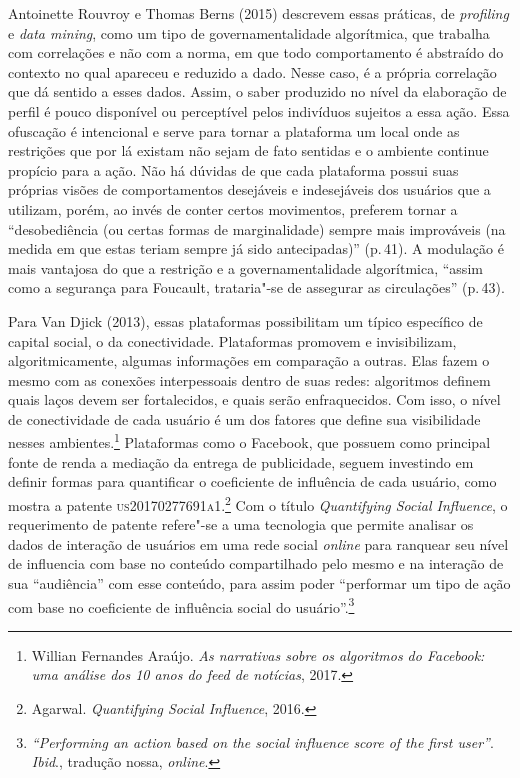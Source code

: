 Antoinette Rouvroy e Thomas Berns (2015) descrevem essas práticas, 
de \textit{profiling} e \textit{data mining}, como um tipo de
governamentalidade algorítmica, que trabalha com correlações e não com a
norma, em que todo comportamento é abstraído do contexto no qual
apareceu e reduzido a dado. Nesse caso, é a própria correlação que dá
sentido a esses dados. Assim, o saber produzido no nível da elaboração
de perfil é pouco disponível ou perceptível pelos indivíduos sujeitos a
essa ação. Essa ofuscação é intencional e serve para tornar a plataforma
um local onde as restrições que por lá existam não sejam de fato
sentidas e o ambiente continue propício para a ação. Não há dúvidas de
que cada plataforma possui suas próprias visões de comportamentos
desejáveis e indesejáveis dos usuários que a utilizam, porém, ao invés
de conter certos movimentos, preferem tornar a ``desobediência (ou
certas formas de marginalidade) sempre mais improváveis (na medida em
que estas teriam sempre já sido antecipadas)'' (p.\,41). A modulação é mais
vantajosa do que a restrição e a governamentalidade algorítmica, ``assim
como a segurança para Foucault, trataria"-se de assegurar as
circulações'' (p.\,43).

Para Van Djick (2013), essas plataformas possibilitam um típico
específico de capital social, o da conectividade. Plataformas promovem e
invisibilizam, algoritmicamente, algumas informações em comparação a
outras. Elas fazem o mesmo com as conexões interpessoais dentro de suas
redes: algoritmos definem quais laços devem ser fortalecidos, e quais
serão enfraquecidos. Com isso, o nível de conectividade de cada usuário
é um dos fatores que define sua visibilidade nesses ambientes.\footnote{Willian Fernandes Araújo. \textit{As narrativas sobre os algoritmos do Facebook: uma
análise dos 10 anos do feed de notícias}, 2017.} %
Plataformas como o Facebook, que possuem como
principal fonte de renda a mediação da entrega de publicidade, seguem
investindo em definir formas para quantificar o coeficiente de
influência de cada usuário, como mostra a patente \textsc{us20170277691a1}.\footnote{Agarwal. \textit{Quantifying Social Influence}, 2016.}
Com o título \textit{Quantifying Social Influence}, o
requerimento de patente refere"-se a uma tecnologia que permite analisar
os dados de interação de usuários em uma rede social \textit{online} para
ranquear seu nível de influencia com base no conteúdo compartilhado pelo
mesmo e na interação de sua ``audiência'' com esse conteúdo, para assim
poder ``performar um tipo de ação com base no coeficiente de influência
social do usuário''.\footnote{\textit{``Performing an action based on the social influence score of the first user''}. \textit{Ibid}., tradução nossa, \textit{online}.}

